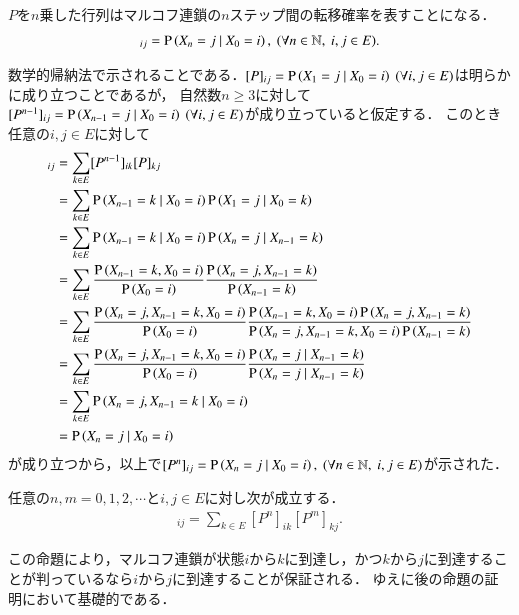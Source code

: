 	$P$を$n$乗した行列はマルコフ連鎖の$n$ステップ間の転移確率を表すことになる．
	\begin{align}
		[P^n]_{ij} = \cprob{X_n = j}{X_0 = i}, \ (\forall n \in \N,\ i,j \in E).
	\end{align}
	
	\begin{prf}
		数学的帰納法で示されることである．$[P]_{ij} = \operatorname{P} \left( X_1 = j \ \middle|\ X_0 = i \right)\ (\forall i,j \in E)$は明らかに成り立つことであるが，
		自然数$n \geq 3$に対して$[P^{n-1}]_{ij}=\cprob{X_{n-1} = j}{X_0 = i}\ (\forall i,j \in E)$が成り立っていると仮定する．
		このとき任意の$i, j \in E$に対して
		\begin{align}
			[P^n]_{ij} &= \sum_{k \in E} [P^{n-1}]_{ik} [P]_{kj} \\
			&= \sum_{k \in E} \cprob{X_{n-1} = k}{X_0 = i} \cprob{X_1 = j}{X_0 = k} \\
			&= \sum_{k \in E} \cprob{X_{n-1} = k}{X_0 = i} \cprob{X_n = j}{X_{n-1} = k} \\
			&= \sum_{k \in E} \frac{\prob{X_{n-1} = k, X_0 = i}}{\prob{X_0 = i}} \frac{\prob{X_n = j, X_{n-1} = k}}{\prob{X_{n-1} = k}} \\
			&= \sum_{k \in E} \frac{\prob{X_n = j, X_{n-1} = k, X_0 = i}}{\prob{X_0 = i}} 
				\frac{\prob{X_{n-1} = k, X_0 = i} \prob{X_n = j, X_{n-1} = k}}{\prob{X_n = j, X_{n-1} = k, X_0 = i} \prob{X_{n-1} = k}} \\
			&= \sum_{k \in E} \frac{\prob{X_n = j, X_{n-1} = k, X_0 = i}}{\prob{X_0 = i}} \frac{\cprob{X_n = j}{X_{n-1} = k}}{\cprob{X_n = j}{X_{n-1} = k}} \\
			&= \sum_{k \in E} \cprob{X_n = j, X_{n-1} = k}{X_0 = i} \\
			&= \cprob{X_n = j}{X_0 = i}
		\end{align}
		が成り立つから，以上で$[P^n]_{ij} = \operatorname{P} \left( X_n = j \ \middle|\ X_0 = i \right), \ (\forall n \in \mathbb{N},\ i,j \in E)$が示された．
		\QED
	\end{prf}

	\begin{prp}
		任意の$n,m = 0,1,2,\cdots$と$i,j \in E$に対し次が成立する．
		\begin{align}
			[P^{n+m}]_{ij} = \sum_{k \in E}[P^n]_{ik}[P^m]_{kj}. 
		\end{align}
	\end{prp}
	この命題により，マルコフ連鎖が状態$i$から$k$に到達し，かつ$k$から$j$に到達することが判っているなら$i$から$j$に到達することが保証される．
	ゆえに後の命題の証明において基礎的である．

